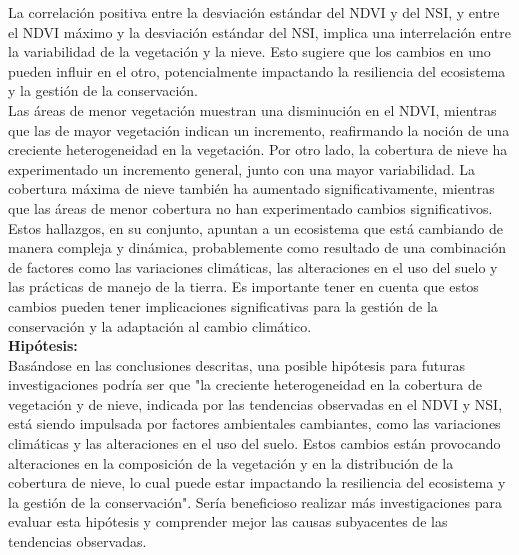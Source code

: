 {La correlación positiva entre la desviación estándar del NDVI y del NSI, y entre el NDVI máximo y la desviación estándar del NSI, implica una interrelación entre la variabilidad de la vegetación y la nieve. Esto sugiere que los cambios en uno pueden influir en el otro, potencialmente impactando la resiliencia del ecosistema y la gestión de la conservación.\\

Las áreas de menor vegetación muestran una disminución en el NDVI, mientras que las de mayor vegetación indican un incremento, reafirmando la noción de una creciente heterogeneidad en la vegetación. Por otro lado, la cobertura de nieve ha experimentado un incremento general, junto con una mayor variabilidad. La cobertura máxima de nieve también ha aumentado significativamente, mientras que las áreas de menor cobertura no han experimentado cambios significativos.\\

Estos hallazgos, en su conjunto, apuntan a un ecosistema que está cambiando de manera compleja y dinámica, probablemente como resultado de una combinación de factores como las variaciones climáticas, las alteraciones en el uso del suelo y las prácticas de manejo de la tierra. Es importante tener en cuenta que estos cambios pueden tener implicaciones significativas para la gestión de la conservación y la adaptación al cambio climático.\\


\textbf{Hipótesis:}\\
Basándose en las conclusiones descritas, una posible hipótesis para futuras investigaciones podría ser que "la creciente heterogeneidad en la cobertura de vegetación y de nieve, indicada por las tendencias observadas en el NDVI y NSI, está siendo impulsada por factores ambientales cambiantes, como las variaciones climáticas y las alteraciones en el uso del suelo. Estos cambios están provocando alteraciones en la composición de la vegetación y en la distribución de la cobertura de nieve, lo cual puede estar impactando la resiliencia del ecosistema y la gestión de la conservación". Sería beneficioso realizar más investigaciones para evaluar esta hipótesis y comprender mejor las causas subyacentes de las tendencias observadas.\\
    
}
